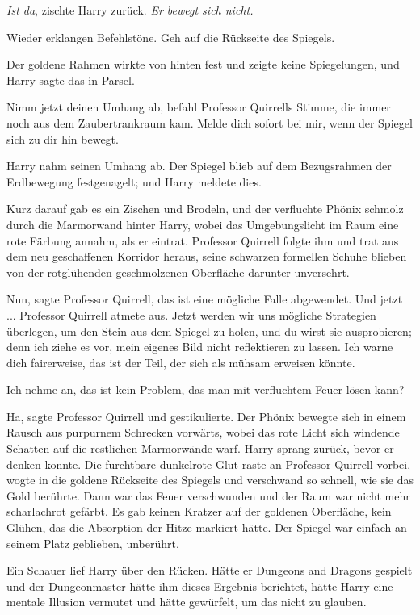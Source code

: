 \glqq{}\emph{Ist da}\grqq{}, zischte Harry zurück. \glqq{}\emph{Er bewegt sich
nicht.}\grqq{}

Wieder erklangen Befehlstöne. \glqq{}Geh auf die Rückseite des Spiegels.\grqq{}

Der goldene Rahmen wirkte von hinten fest und zeigte keine Spiegelungen, und
Harry sagte das in Parsel.

\glqq{}Nimm jetzt deinen Umhang ab\grqq{}, befahl Professor Quirrells Stimme, die
immer noch aus dem Zaubertrankraum kam. \glqq{}Melde dich sofort bei mir, wenn
der Spiegel sich zu dir hin bewegt.\grqq{}

Harry nahm seinen Umhang ab. Der Spiegel blieb auf dem Bezugsrahmen der
Erdbewegung festgenagelt; und Harry meldete dies.

Kurz darauf gab es ein Zischen und Brodeln, und der verfluchte Phönix schmolz
durch die Marmorwand hinter Harry, wobei das Umgebungslicht im Raum eine rote
Färbung annahm, als er eintrat. Professor Quirrell folgte ihm und trat aus dem
neu geschaffenen Korridor heraus, seine schwarzen formellen Schuhe blieben von
der rotglühenden geschmolzenen Oberfläche darunter unversehrt.

\glqq{}Nun\grqq{}, sagte Professor Quirrell, \glqq{}das ist eine mögliche Falle
abgewendet. Und jetzt ...\grqq{} Professor Quirrell atmete aus. \glqq{}Jetzt
werden wir uns mögliche Strategien überlegen, um den Stein aus dem Spiegel zu
holen, und du wirst sie ausprobieren; denn ich ziehe es vor, mein eigenes Bild
nicht reflektieren zu lassen. Ich warne dich fairerweise, das ist der Teil, der
sich als mühsam erweisen könnte.\grqq{}

\glqq{}Ich nehme an, das ist kein Problem, das man mit verfluchtem Feuer lösen
kann?\grqq{}

\glqq{}Ha\grqq{}, sagte Professor Quirrell und gestikulierte. Der Phönix bewegte
sich in einem Rausch aus purpurnem Schrecken vorwärts, wobei das rote Licht sich
windende Schatten auf die restlichen Marmorwände warf. Harry sprang zurück,
bevor er denken konnte. Die furchtbare dunkelrote Glut raste an Professor
Quirrell vorbei, wogte in die goldene Rückseite des Spiegels und verschwand so
schnell, wie sie das Gold berührte. Dann war das Feuer verschwunden und der Raum
war nicht mehr scharlachrot gefärbt. Es gab keinen Kratzer auf der goldenen
Oberfläche, kein Glühen, das die Absorption der Hitze markiert hätte. Der
Spiegel war einfach an seinem Platz geblieben, unberührt.

Ein Schauer lief Harry über den Rücken. Hätte er Dungeons and Dragons gespielt
und der Dungeonmaster hätte ihm dieses Ergebnis berichtet, hätte Harry eine
mentale Illusion vermutet und hätte gewürfelt, um das nicht zu glauben.

